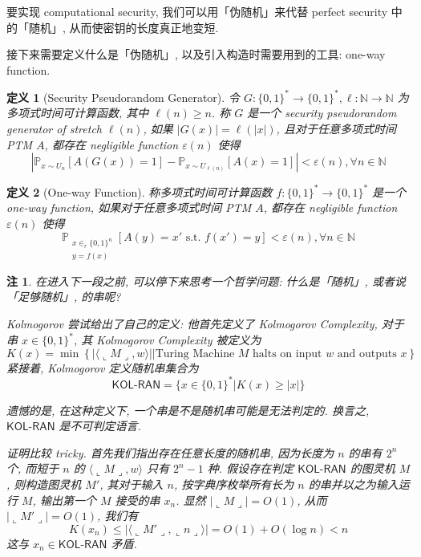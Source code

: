 \documentclass[8pt]{article}
\theoremstyle{compact}
\newtheorem{definition}{定义}[section]
\newtheorem{remark}{注}[section]
\def\le{\leqslant}
\def\ge{\geqslant}
\def\rep#1{\llcorner{#1}\lrcorner}
\begin{document}
要实现 computational security, 我们可以用「伪随机」来代替 perfect security 中的「随机」, 从而使密钥的长度真正地变短.

接下来需要定义什么是「伪随机」, 以及引入构造时需要用到的工具: one-way function.

\begin{definition}[Security Pseudorandom Generator]
	令 $G: \{0, 1\}^* \to \{0, 1\}^*, \ell: \mathbb N \to \mathbb N$ 为多项式时间可计算函数, 其中 $\ell(n) \ge n$. 称 $G$ 是一个 security pseudorandom generator of stretch $\ell(n)$, 如果 $|G(x)| = \ell(|x|)$, 且对于任意多项式时间 PTM $A$, 都存在 negligible function $\varepsilon(n)$ 使得 $$\left|\mathbb P_{x \sim U_n}[A(G(x)) = 1] - \mathbb P_{x \sim U_{\ell(n)}}[A(x) = 1]\right| < \varepsilon(n), \forall n \in \mathbb N$$
\end{definition}

\begin{definition}[One-way Function]
	称多项式时间可计算函数 $f: \{0, 1\}^* \to \{0, 1\}^*$ 是一个 one-way function, 如果对于任意多项式时间 PTM $A$, 都存在 negligible function $\varepsilon(n)$ 使得 $$\mathbb P_{\substack{x \in_r \{0, 1\}^n \\ y = f(x)}}[A(y) = x' \text{ s.t. } f(x') = y] < \varepsilon(n), \forall n \in \mathbb N$$
\end{definition}

\begin{remark}
	在进入下一段之前, 可以停下来思考一个哲学问题: 什么是「随机」, 或者说「足够随机」, 的串呢?

	Kolmogorov 尝试给出了自己的定义: 他首先定义了 Kolmogorov Complexity, 对于串 $x \in \{0, 1\}^*$, 其 Kolmogorov Complexity 被定义为 $$K(x) = \min \left\{|\langle \rep{M}, w\rangle | \bigg|\text{Turing Machine } M \text{ halts on input } w \text{ and outputs }x\right\}$$ 紧接着, Kolmogorov 定义随机串集合为 $$\textsf{KOL-RAN} = \{x \in \{0, 1\}^*| K(x) \ge |x|\}$$

	遗憾的是, 在这种定义下, 一个串是不是随机串可能是无法判定的. 换言之, $\textsf{KOL-RAN}$ 是不可判定语言.

	证明比较 tricky. 首先我们指出存在任意长度的随机串, 因为长度为 $n$ 的串有 $2^n$ 个, 而短于 $n$ 的 $\langle \rep{M}, w\rangle$ 只有 $2^n - 1$ 种. 假设存在判定 $\textsf{KOL-RAN}$ 的图灵机 $M$, 则构造图灵机 $M'$, 其对于输入 $n$, 按字典序枚举所有长为 $n$ 的串并以之为输入运行 $M$, 输出第一个 $M$ 接受的串 $x_n$. 显然 $|\rep{M}| = O(1)$, 从而 $|\rep{M'}| = O(1)$, 我们有 $$K(x_n) \le |\langle \rep{M'}, \rep{n}\rangle| = O(1) + O(\log n) < n$$ 这与 $x_n \in \textsf{KOL-RAN}$ 矛盾.
\end{remark}
\end{document}
